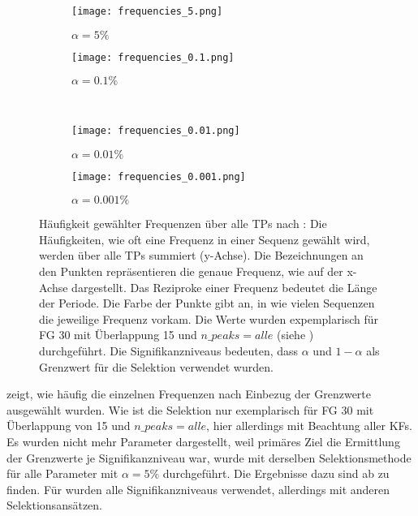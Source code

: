         \begin{figure}[H]
            \centering
            \begin{subfigure}{.45\textwidth}
                \texttt{[image: frequencies\_5.png]}
                \caption{$\alpha=5\%$}
                \label{fig:frequencies_5}
            \end{subfigure}
            \begin{subfigure}{.45\textwidth}
                \texttt{[image: frequencies\_0.1.png]}
                \caption{$\alpha=0.1\%$}
                \label{fig:frequencies_0.1}
            \end{subfigure}\\
            \begin{subfigure}{.45\textwidth}
                \texttt{[image: frequencies\_0.01.png]}
                \caption{$\alpha=0.01\%$}
                \label{fig:frequencies_0.01}
            \end{subfigure}
            \begin{subfigure}{.45\textwidth}
                \texttt{[image: frequencies\_0.001.png]}
                \caption{$\alpha=0.001\%$}
                \label{fig:frequencies_0.001}
            \end{subfigure}
            \caption[Häufigkeit gewählter Frequenzen über alle \aclp{TP} nach ]{Häufigkeit gewählter Frequenzen über alle \acp{TP} nach : Die Häufigkeiten, wie oft eine Frequenz in einer Sequenz gewählt wird, werden über alle \acp{TP} summiert (y-Achse). Die Bezeichnungen an den Punkten repräsentieren die genaue Frequenz, wie auf der x-Achse dargestellt. Das Reziproke einer Frequenz bedeutet die Länge der Periode. Die Farbe der Punkte gibt an, in wie vielen Sequenzen die jeweilige Frequenz vorkam. Die Werte wurden expemplarisch für \acl{FG} 30 mit Überlappung 15 und $n\_peaks=alle$ (siehe ) durchgeführt. Die Signifikanzniveaus bedeuten, dass $\alpha$ und $1-\alpha$ als Grenzwert für die Selektion verwendet wurden.}
            \label{fig:frequencies_uniref}
        \end{figure}

         zeigt, wie häufig die einzelnen Frequenzen nach Einbezug der Grenzwerte ausgewählt wurden. Wie  ist die Selektion nur exemplarisch für \ac{FG} 30 mit Überlappung von 15 und $n\_peaks = alle$, hier allerdings mit Beachtung aller \acp{KF}. Es wurden nicht mehr Parameter dargestellt, weil primäres Ziel die Ermittlung der Grenzwerte je Signifikanzniveau war,  wurde mit derselben Selektionsmethode für alle Parameter mit $\alpha=5\%$ durchgeführt. Die Ergebnisse dazu sind ab  zu finden. Für  wurden alle Signifikanzniveaus verwendet, allerdings mit anderen Selektionsansätzen.

